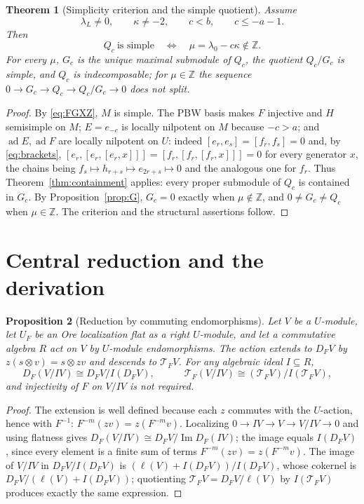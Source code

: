 \documentclass[11pt,a4paper]{article}
\newcommand{\Z}{\mathbb Z}
\newcommand{\ad}{\operatorname{ad}}
\newcommand{\im}{\operatorname{Im}}
\newcommand{\T}{\mathcal T}
\newtheorem{theorem}{Theorem}[section]
\newtheorem{proposition}[theorem]{Proposition}
\begin{document}
\begin{theorem}[Simplicity criterion and the simple quotient]
\label{thm:deep}
Assume
\begin{equation}\label{eq:deep-assumptions}
 \lambda_L\ne0,\qquad \kappa\ne-2,\qquad c<b,\qquad c\le-a-1.
\end{equation}
Then
\[
 \boxed{\quad Q_c\ \text{is simple}\quad\Longleftrightarrow\quad
 \mu=\lambda_0-c\kappa\notin\Z.\quad}
\]
For every $\mu$, $G_c$ is the unique maximal submodule of $Q_c$, the
quotient $Q_c/G_c$ is simple, and $Q_c$ is indecomposable; for
$\mu\in\Z$ the sequence $0\to G_c\to Q_c\to Q_c/G_c\to0$ does not
split.
\end{theorem}
\begin{proof}
By \eqref{eq:FGXZ}, $M$ is simple. The PBW basis makes $F$ injective and
$H$ semisimple on $M$; $E=e_{-c}$ is locally nilpotent on $M$ because
$-c>a$; and $\ad E,\ad F$ are locally nilpotent on $U$: indeed
$[e_r,e_s]=[f_r,f_s]=0$ and, by \eqref{eq:brackets},
$[e_r,[e_r,[e_r,x]]]=[f_r,[f_r,[f_r,x]]]=0$ for every generator $x$, the
chains being $f_s\mapsto h_{r+s}\mapsto e_{2r+s}\mapsto0$ and the
analogous one for $f_r$. Thus Theorem~\ref{thm:containment} applies: every
proper submodule of $Q_c$ is contained in $G_c$. By Proposition~\ref{prop:G},
$G_c=0$ exactly when $\mu\notin\Z$, and $0\ne G_c\ne Q_c$ when
$\mu\in\Z$. The criterion and the structural assertions follow.
\end{proof}

\section{Central reduction and the derivation}
\label{sec:central}

\begin{proposition}[Reduction by commuting endomorphisms]
\label{prop:reduction}
Let $V$ be a $U$-module, let $U_F$ be an Ore localization flat as a right
$U$-module, and let a commutative algebra $R$ act on $V$ by $U$-module
endomorphisms. The action extends to $D_FV$ by $z(s\otimes v)=s\otimes zv$
and descends to $\T_FV$. For any algebraic ideal $I\subseteq R$,
\[
 D_F(V/IV)\cong D_FV/I(D_FV),\qquad
 \boxed{\quad\T_F(V/IV)\cong(\T_FV)/I(\T_FV),\quad}
\]
and injectivity of $F$ on $V/IV$ is not required.
\end{proposition}
\begin{proof}
The extension is well defined because each $z$ commutes with the
$U$-action, hence with $F^{-1}$: $F^{-m}(zv)=z(F^{-m}v)$. Localizing
$0\to IV\to V\to V/IV\to0$ and using flatness gives
$D_F(V/IV)\cong D_FV/\im D_F(IV)$; the image equals $I(D_FV)$, since
every element is a finite sum of terms $F^{-m}(zv)=z(F^{-m}v)$. The image
of $V/IV$ in $D_FV/I(D_FV)$ is $(\ell(V)+I(D_FV))/I(D_FV)$, whose cokernel
is $D_FV/(\ell(V)+I(D_FV))$; quotienting $\T_FV=D_FV/\ell(V)$ by
$I(\T_FV)$ produces exactly the same expression.
\end{proof}
\end{document}
